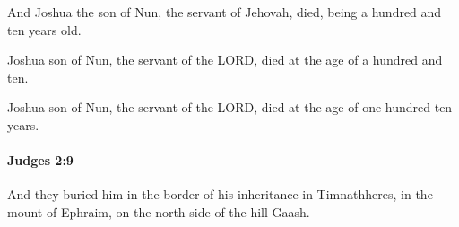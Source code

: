 			\begin{versebox}
					\item[BHS] 
					\item[ASV] And Joshua the son of Nun, the servant of Jehovah, died, being a hundred and ten years old.
					\item[NIV] Joshua son of Nun, the servant of the LORD, died at the age of a hundred and ten.
					\item[NRSV] Joshua son of Nun, the servant of the LORD, died at the age of one hundred ten years.
			\end{versebox}

		\paragraph{Judges 2:9} %
			\label{JUDGES-2-9}

			And they buried him in the border of his inheritance in Timnathheres, in the mount of Ephraim, on the north side of the hill Gaash.

